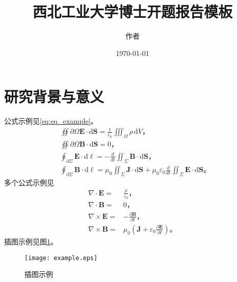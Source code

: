 \documentclass[a4paper,12pt]{NPUResearchProposal}
\begin{document}
\title{西北工业大学博士开题报告模板}

\author{作者}
\AppResearch %
\date{\today}       
\maketitle

\section{研究背景与意义}
\label{sec:background}
公式示例见\eqref{eq:eq_example}。
\begin{equation}
  \label{eq:eq_example}
  \begin{split}
    &\oiint{\scriptstyle\partial \Omega
    }\mathbf{E}\cdot\mathrm{d}\mathbf{S} = \frac{1}{\varepsilon_0}
    \iiint_\Omega \rho \,\mathrm{d}V\textit{，}\\
   & \oiint{\scriptstyle \partial \Omega
    }\mathbf{B}\cdot\mathrm{d}\mathbf{S} = 0\textit{，}\\
    &\oint_{\partial \Sigma} \mathbf{E} \cdot
    \mathrm{d}\boldsymbol{\ell} = - \frac{d}{dt} \iint_{\Sigma}
    \mathbf{B} \cdot \mathrm{d}\mathbf{S} \textit{，}\\
    &\oint_{\partial \Sigma} \mathbf{B} \cdot \mathrm{d}\boldsymbol{\ell} = \mu_0 \iint_{\Sigma} \mathbf{J} \cdot \mathrm{d}\mathbf{S} + \mu_0 \varepsilon_0 \frac{d}{dt} \iint_{\Sigma} \mathbf{E} \cdot \mathrm{d}\mathbf{S}\textit{。}
  \end{split}
\end{equation}
多个公式示例见
\begin{subequations}
  \begin{align}\label{eq:eq_example2}
    \nabla \cdot \mathbf{E} = &\frac {\rho} {\varepsilon_0}\textit{，}\\
    \nabla \cdot \mathbf{B} =& 0\textit{，}\\
    \nabla \times \mathbf{E} =& -\frac{\partial \mathbf{B}} {\partial
      t}\textit{，}\\
    \nabla \times \mathbf{B} = &\mu_0\left(\mathbf{J} + \varepsilon_0 \frac{\partial \mathbf{E}} {\partial t} \right) \textit{。}
  \end{align}
\end{subequations}
插图示例见图\ref{fig:fig_example}。
\begin{figure}[!h]
  \centering
  \texttt{[image: example.eps]}
  \caption{插图示例}
  \label{fig:fig_example}
\end{figure}
\end{document}
